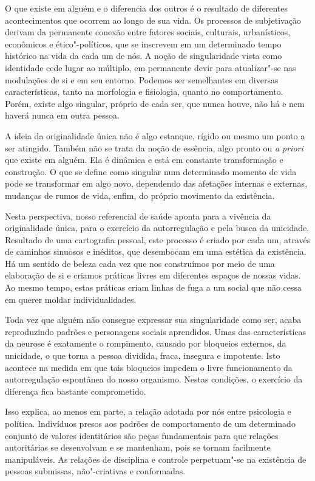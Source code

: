 O que existe em alguém e o diferencia dos outros é o resultado de
diferentes acontecimentos que ocorrem ao longo de sua vida. Os processos
de subjetivação derivam da permanente conexão entre fatores sociais,
culturais, urbanísticos, econômicos e ético"-políticos, que se inscrevem
em um determinado tempo histórico na vida da cada um de nós. A noção de
singularidade vista como identidade cede lugar ao múltiplo, em
permanente devir para atualizar"-se nas modulações de si e em seu
entorno. Podemos ser semelhantes em diversas características, tanto na
morfologia e fisiologia, quanto no comportamento. Porém, existe algo
singular, próprio de cada ser, que nunca houve, não há e nem haverá
nunca em outra pessoa.

A ideia da originalidade única não é algo estanque, rígido ou mesmo um
ponto a ser atingido. Também não se trata da noção de essência, algo
pronto ou \emph{a priori} que existe em alguém. Ela é dinâmica e está em
constante transformação e construção. O que se define como singular num
determinado momento de vida pode se transformar em algo novo,
dependendo das afetações internas e externas, mudanças de rumos de vida,
enfim, do próprio movimento da existência.

Nesta perspectiva, nosso referencial de saúde aponta para a vivência da
originalidade única, para o exercício da autorregulação e pela busca da
unicidade. Resultado de uma cartografia pessoal, este processo é criado
por cada um, através de caminhos sinuosos e inéditos, que desembocam em
uma estética da existência. Há um sentido de beleza cada vez que nos
construímos por meio de uma elaboração de si e criamos práticas livres
em diferentes espaços de nossas vidas. Ao mesmo tempo, estas práticas
criam linhas de fuga a um social que não cessa em querer moldar
individualidades.

Toda vez que alguém não consegue expressar sua singularidade como ser,
acaba reproduzindo padrões e personagens sociais aprendidos. Umas das
características da neurose é exatamente o rompimento, causado por
bloqueios externos, da unicidade, o que torna a pessoa dividida, fraca,
insegura e impotente. Isto acontece na medida em que tais bloqueios
impedem o livre funcionamento da autorregulação espontânea do nosso
organismo. Nestas condições, o exercício da diferença fica bastante
comprometido.

Isso explica, ao menos em parte, a relação adotada por nós entre
psicologia e política. Indivíduos presos aos padrões de comportamento de
um determinado conjunto de valores identitários são peças fundamentais
para que relações autoritárias se desenvolvam e se mantenham, pois se
tornam facilmente manipuláveis. As relações de disciplina e controle
perpetuam"-se na existência de pessoas submissas, não"-criativas e
conformadas.

